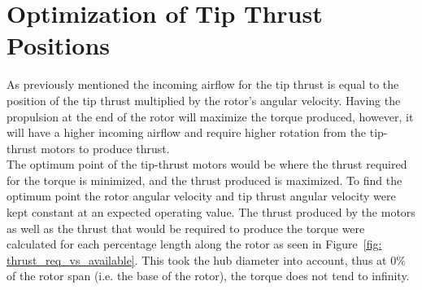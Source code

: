     \section{Optimization of Tip Thrust Positions}
        As previously mentioned the incoming airflow for the tip thrust is equal to the position of the tip thrust multiplied by the rotor's angular velocity. Having the propulsion at the end of the rotor will maximize the torque produced, however, it will have a higher incoming airflow and require higher rotation from the tip-thrust motors to produce thrust.\\ 
        The optimum point of the tip-thrust motors would be where the thrust required for the torque is minimized, and the thrust produced is maximized. To find the optimum point the rotor angular velocity and tip thrust angular velocity were kept constant at an expected operating value. The thrust produced by the motors as well as the thrust that would be required to produce the torque were calculated for each percentage length along the rotor as seen in Figure~\ref{fig: thrust_req_vs_available}. This took the hub diameter into account, thus at 0\% of the rotor span (i.e. the base of the rotor), the torque does not tend to infinity.

